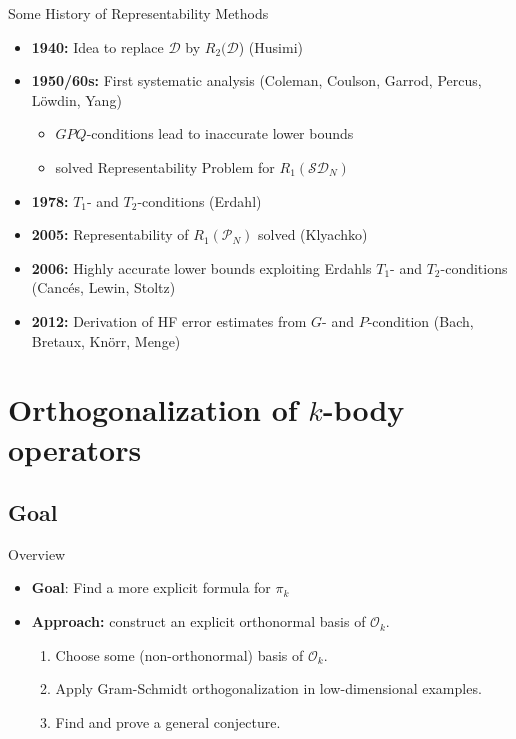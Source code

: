 \documentclass{beamer}
\newcommand{\DensityMatrices}{\mathcal{D}}
\newcommand{\kbOp}[1][k]{{\ensuremath{\mathcal{O}_{#1}}}}
\begin{document}
\begin{frame}{Some History of Representability Methods}
    \begin{itemize}
        \item \textbf{1940:} Idea to replace $\DensityMatrices$ by $R_2(\DensityMatrices$) (Husimi)
        \item \textbf{1950/60s:} First systematic analysis (Coleman, Coulson, Garrod, Percus, Löwdin, Yang)
        \begin{itemize}
            \item $GPQ$-conditions lead to inaccurate lower bounds
            \item solved Representability Problem for $R_1(\mathcal{SD}_N)$
        \end{itemize}
        \item \textbf{1978:} $T_1$- and $T_2$-conditions (Erdahl)
        \item \textbf{2005:} Representability of $R_1(\mathcal{P}_N)$ solved  (Klyachko)
        \item \textbf{2006:} Highly accurate lower bounds exploiting Erdahls $T_1$- and $T_2$-conditions (Cancés, Lewin, Stoltz)
        \item \textbf{2012:} Derivation of HF error estimates from $G$- and $P$-condition (Bach, Bretaux, Knörr, Menge)
    \end{itemize}
\end{frame}

\section{Orthogonalization of $k$-body operators}
\subsection{Goal}
\begin{frame}{Overview}
\begin{itemize}
    \item \textbf{Goal}: Find a more explicit formula for $\pi_k$
    \item<3-> \textbf{Approach:} construct an explicit orthonormal basis of $\kbOp$.
    \begin{enumerate}
        \item Choose some (non-orthonormal) basis of $\kbOp$.
        \item Apply Gram-Schmidt orthogonalization in low-dimensional examples.
        \item Find and prove a general conjecture.
    \end{enumerate}
\end{itemize}
\end{frame}
\end{document}
